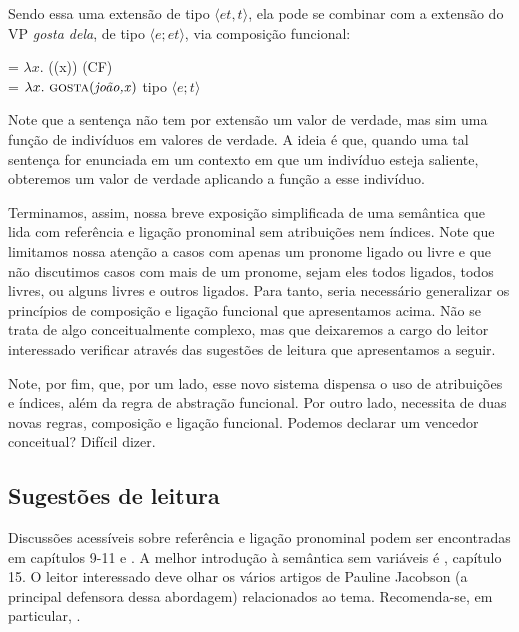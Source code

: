 \n Sendo essa uma extensão de tipo $\langle et,t \rangle$, ela pode se combinar com a extensão do VP \textit{gosta dela}, de tipo $\langle e;et \rangle$, via composição funcional:

\begin{exe}
	\ex {} = $\lambda x.$ ((x)) \hfill (CF)\\
	 = $\lambda x.\ \text{\textsc{gosta}(\textit{joão,x})}$  \hfill tipo $\langle e;t \rangle$
\end{exe}

\n Note que a sentença não tem por extensão um valor de verdade, mas sim uma função de indivíduos em valores de verdade. A ideia é que, quando uma tal sentença for enunciada em um contexto em que um indivíduo esteja saliente, obteremos um valor de verdade aplicando a função a esse indivíduo.

Terminamos, assim, nossa breve exposição simplificada de uma semântica que lida com referência e ligação pronominal sem atribuições nem índices. Note que limitamos nossa atenção a casos com apenas um pronome ligado ou livre e que não discutimos casos com mais de um pronome, sejam eles todos ligados, todos livres, ou alguns livres e outros ligados. Para tanto, seria necessário generalizar os princípios de composição e ligação funcional que apresentamos acima. Não se trata de algo conceitualmente complexo, mas que deixaremos a cargo do leitor interessado verificar através das sugestões de leitura que apresentamos a seguir. 

Note, por fim, que, por um lado, esse novo sistema dispensa o uso de atribuições e índices, além da regra de abstração funcional. Por outro lado, necessita de duas novas regras,  composição e ligação funcional. Podemos declarar um vencedor conceitual? Difícil dizer.


\bigskip

\begin{tcolorbox}[parbox=false,boxrule=0pt,sharp corners,breakable]

\section*{Sugestões de leitura}

Discussões acessíveis sobre referência e ligação pronominal podem ser encontradas em \cite{heikra98} capítulos 9-11 e \cite{buring05}. A melhor introdução à semântica sem variáveis é \cite{jacobson14}, capítulo 15. O leitor interessado deve olhar os vários artigos de Pauline Jacobson (a principal defensora dessa abordagem) relacionados ao tema. Recomenda-se, em particular, \cite{jacobson99}.

\end{tcolorbox}

